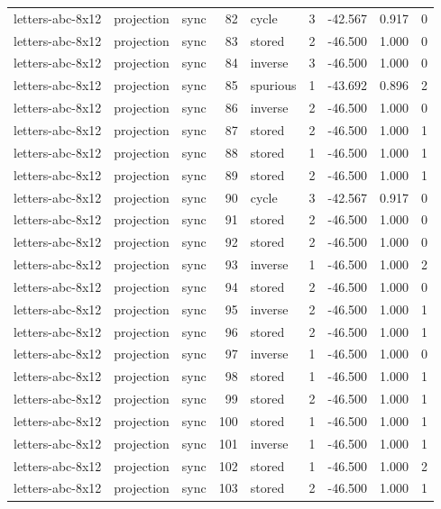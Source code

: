 \begin{tabular}{lllrlrrrr}
letters-abc-8x12 & projection & sync & 82 & cycle & 3 & -42.567 & 0.917 & 0 \\
letters-abc-8x12 & projection & sync & 83 & stored & 2 & -46.500 & 1.000 & 0 \\
letters-abc-8x12 & projection & sync & 84 & inverse & 3 & -46.500 & 1.000 & 0 \\
letters-abc-8x12 & projection & sync & 85 & spurious & 1 & -43.692 & 0.896 & 2 \\
letters-abc-8x12 & projection & sync & 86 & inverse & 2 & -46.500 & 1.000 & 0 \\
letters-abc-8x12 & projection & sync & 87 & stored & 2 & -46.500 & 1.000 & 1 \\
letters-abc-8x12 & projection & sync & 88 & stored & 1 & -46.500 & 1.000 & 1 \\
letters-abc-8x12 & projection & sync & 89 & stored & 2 & -46.500 & 1.000 & 1 \\
letters-abc-8x12 & projection & sync & 90 & cycle & 3 & -42.567 & 0.917 & 0 \\
letters-abc-8x12 & projection & sync & 91 & stored & 2 & -46.500 & 1.000 & 0 \\
letters-abc-8x12 & projection & sync & 92 & stored & 2 & -46.500 & 1.000 & 0 \\
letters-abc-8x12 & projection & sync & 93 & inverse & 1 & -46.500 & 1.000 & 2 \\
letters-abc-8x12 & projection & sync & 94 & stored & 2 & -46.500 & 1.000 & 0 \\
letters-abc-8x12 & projection & sync & 95 & inverse & 2 & -46.500 & 1.000 & 1 \\
letters-abc-8x12 & projection & sync & 96 & stored & 2 & -46.500 & 1.000 & 1 \\
letters-abc-8x12 & projection & sync & 97 & inverse & 1 & -46.500 & 1.000 & 0 \\
letters-abc-8x12 & projection & sync & 98 & stored & 1 & -46.500 & 1.000 & 1 \\
letters-abc-8x12 & projection & sync & 99 & stored & 2 & -46.500 & 1.000 & 1 \\
letters-abc-8x12 & projection & sync & 100 & stored & 1 & -46.500 & 1.000 & 1 \\
letters-abc-8x12 & projection & sync & 101 & inverse & 1 & -46.500 & 1.000 & 1 \\
letters-abc-8x12 & projection & sync & 102 & stored & 1 & -46.500 & 1.000 & 2 \\
letters-abc-8x12 & projection & sync & 103 & stored & 2 & -46.500 & 1.000 & 1 \\

\end{tabular}
